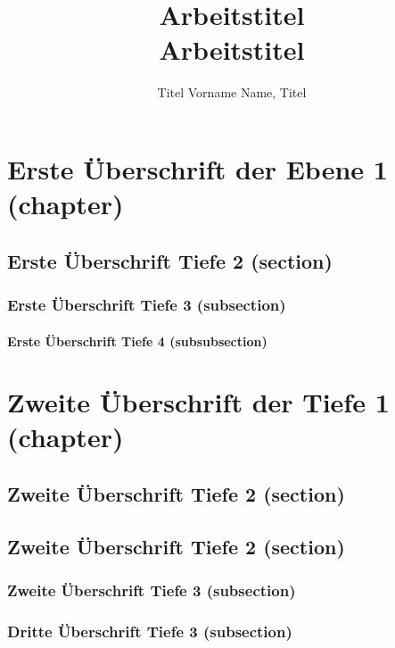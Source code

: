 \documentclass[MMR,Master,english]{twbook}%
\title{Arbeitstitel\\Arbeitstitel}
\author{Titel Vorname Name, Titel}
\begin{document}
\maketitle

%
%
\chapter{Erste Überschrift der Ebene 1 (chapter)}
\blinddocument

\blindmathpaper

\section{Erste Überschrift Tiefe 2 (section)}
\blindtext

\subsection{Erste Überschrift Tiefe 3 (subsection)}
\blindtext

\subsubsection{Erste Überschrift Tiefe 4 (subsubsection)}
\blindtext

\chapter{Zweite Überschrift der Tiefe 1 (chapter)}
\blindtext

\section{Zweite Überschrift Tiefe 2 (section)}
\blindtext

\section{Zweite Überschrift Tiefe 2 (section)}
\blindtext

\subsection{Zweite Überschrift Tiefe 3 (subsection)}
\blindtext

\subsection{Dritte Überschrift Tiefe 3 (subsection)}
\blindtext
\end{document}
